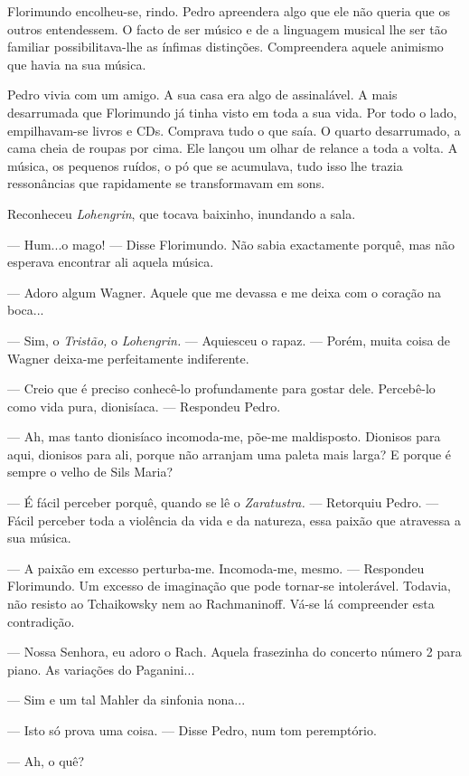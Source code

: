 Florimundo encolheu-se, rindo. Pedro apreendera algo que ele não queria
que os outros entendessem. O facto de ser músico e de a linguagem
musical lhe ser tão familiar possibilitava-lhe as ínfimas distinções.
Compreendera aquele animismo que havia na sua música.

Pedro vivia com um amigo. A sua casa era algo de assinalável. A mais
desarrumada que Florimundo já tinha visto em toda a sua vida. Por todo o
lado, empilhavam-se livros e CDs. Comprava tudo o que saía. O quarto
desarrumado, a cama cheia de roupas por cima. Ele lançou um olhar de
relance a toda a volta. A música, os pequenos ruídos, o pó que se
acumulava, tudo isso lhe trazia ressonâncias que rapidamente se
transformavam em sons.

Reconheceu \emph{Lohengrin}, que tocava baixinho, inundando a sala.

--- Hum...o mago! --- Disse Florimundo. Não sabia exactamente porquê, mas
não esperava encontrar ali aquela música.

--- Adoro algum Wagner. Aquele que me devassa e me deixa com o coração na
boca...

--- Sim, o \emph{Tristão, }o \emph{Lohengrin. }--- Aquiesceu o rapaz. ---
Porém, muita coisa de Wagner deixa-me perfeitamente indiferente.

--- Creio que é preciso conhecê-lo profundamente para gostar dele.
Percebê-lo como vida pura, dionisíaca. ---  Respondeu Pedro.

--- Ah, mas tanto dionisíaco incomoda-me, põe-me maldisposto. Dionisos
para aqui, dionisos para ali, porque não arranjam uma paleta mais larga?
E porque é sempre o velho de Sils Maria?

--- É fácil perceber porquê, quando se lê o \emph{Zaratustra. }--- Retorquiu
Pedro. --- Fácil perceber toda a violência da vida e da natureza, essa
paixão que atravessa a sua música.

--- A paixão em excesso perturba-me. Incomoda-me, mesmo. --- Respondeu
Florimundo. Um excesso de imaginação que pode tornar-se intolerável.
Todavia, não resisto ao Tchaikowsky nem ao Rachmaninoff. Vá-se lá
compreender esta contradição.

--- Nossa Senhora, eu adoro o Rach. Aquela frasezinha do concerto número 2
para piano. As variações do Paganini...

--- Sim e um tal Mahler da sinfonia nona...

--- Isto só prova uma coisa. --- Disse Pedro, num tom peremptório.

--- Ah, o quê?

